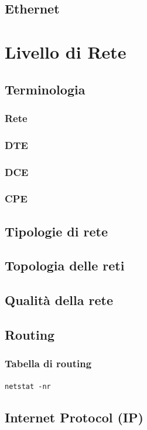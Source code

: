 \documentclass[a4paper,11pt]{paper}
\def\code#1{\texttt{#1}}
\begin{document}
\subsection{Ethernet}


\newpage
\section{Livello di Rete}

\subsection{Terminologia}
\subsubsection{Rete}
\subsubsection{DTE}
\subsubsection{DCE}
\subsubsection{CPE}
\subsection{Tipologie di rete}
\subsection{Topologia delle reti}
\subsection{Qualità della rete}
\subsection{Routing}
\subsubsection{Tabella di routing}
\code{netstat -nr}

\subsection{Internet Protocol (IP)}
\end{document}

